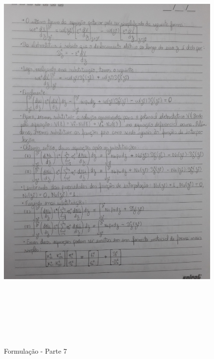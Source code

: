 \documentclass[10pt]{article}
\begin{document}
    \begin{figure}[!htb]
    \centerline{\includegraphics[width=20cm,height=22cm]{Formulação Matemática/Formulacao - Parte 7.jpg}}
    \caption{Formulação - Parte 7}
    \label{fig:fp7}
    \end{figure}
    
\end{document}
